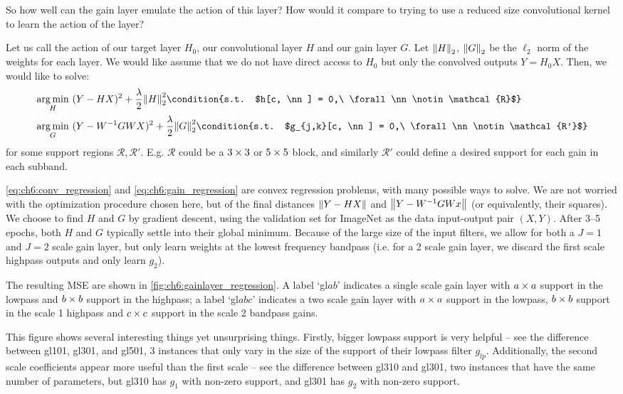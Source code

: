 So how well can the gain layer emulate the action of this layer? How would it
compare to trying to use a reduced size convolutional kernel to learn the 
action of the layer? 

Let us call the action of our target layer $H_0$, our convolutional layer $H$
and our gain layer $G$. Let ${\left\lVert H \right\rVert}_{2}$, ${\left\lVert G \right\rVert}_{2}$ be the $\ell_2$ norm
of the weights for each layer. We would like assume that we do not have direct
access to $H_0$ but only the convolved outputs $Y=H_0 X$. Then, we would like to solve:
\begin{align}
  & \argmin_{H}\ (Y - HX)^2 + \frac{\lambda}{2} \lnorm{H}{2}^2 
  \condition{s.t. $h[c, \nn] = 0,\ \forall \nn \notin \mathcal{R}$} \label{eq:ch6:conv_regression}\\
  & \argmin_{G}\ (Y - W^{-1}GWX)^2 + \frac{\lambda}{2} \lnorm{G}{2}^2 
  \condition{s.t. $g_{j,k}[c, \nn] = 0,\ \forall \nn \notin \mathcal{R'}$} \label{eq:ch6:gain_regression}
\end{align}
for some support regions $\mathcal{R},\mathcal{R'}$. E.g. $\mathcal{R}$ could be a $3\times3$ or $5\times5$ 
block, and similarly $\mathcal{R'}$ could define a desired support for each gain in each 
subband. 

\eqref{eq:ch6:conv_regression} and \eqref{eq:ch6:gain_regression} are convex regression
problems, with many possible ways to solve. We are not worried with the
optimization procedure chosen here, but of the final distances $\left\lVert Y-HX \right\rVert$
and $\left\lVert Y-W^{-1}GWx \right\rVert$ (or equivalently, their squares). We choose to find $H$ and $G$ by 
gradient descent, using the validation set for ImageNet as the data input-output
pair $(X, Y)$. After 3--5 epochs, both $H$ and $G$ typically settle into their
global minimum. Because of the large size of the input filters, we allow for
both a $J=1$ and $J=2$ scale gain layer, but only learn weights at the lowest
frequency bandpass (i.e. for a 2 scale gain layer, we discard the first scale
highpass outputs and only learn $g_2$). 

The resulting MSE are shown in \autoref{fig:ch6:gainlayer_regression}. A label
`gl$ab$' indicates a single scale gain layer with $a\times a$ support in the lowpass
and $b\times b$ support in the highpass; a label `gl$abc$' indicates a two scale
gain layer with $a\times a$ support in the lowpass, $b\times b$ support in the scale 1
highpass and $c\times c$ support in the scale 2 bandpass gains.

This
figure shows several interesting things yet unsurprising things. Firstly, bigger
lowpass support is very helpful -- see the difference between gl101, gl301, and
gl501, 3 instances that only vary in the size of the support of their lowpass
filter $g_{lp}$. Additionally, the second scale coefficients appear more useful
than the first scale -- see the difference between gl310 and gl301, two
instances that have the same number of parameters, but gl310 has $g_1$ with non-zero 
support, and gl301 has $g_2$ with non-zero support.


